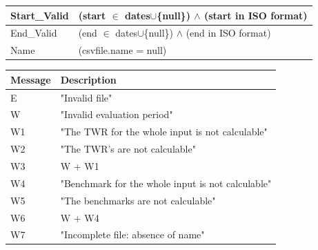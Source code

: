 \documentclass[runningheads,12pt]{article}
\begin{document}
{\begin{longtable}{|l|p{12cm}|}
\hline
 Start\_Valid & (start $\in$ dates$\cup$\{null\}) $\wedge$ (start in ISO format)\\

\hline
 End\_Valid & (end $\in$ dates$\cup$\{null\}) $\wedge$ (end in ISO format)\\

\hline
Name & (csvfile.name = null)\\

\hline
\end{longtable}

\centering
\begin{longtable}{|l|p{13cm}|}
\hline
\textbf{Message} & \textbf{Description}\\

\hline
 E & "Invalid file"\\

\hline
W & "Invalid evaluation period"\\

\hline
W1 & "The TWR for the whole input is not calculable"\\

\hline
W2 & "The TWR's are not calculable"\\

\hline
W3 & W + W1\\

\hline
W4 &  "Benchmark for the whole input is not calculable"\\

\hline
W5 & "The benchmarks are not calculable"\\

\hline
W6 & W + W4\\

\hline
W7 & "Incomplete file: absence of name"\\

\hline

\end{longtable}
}
\end{document}

